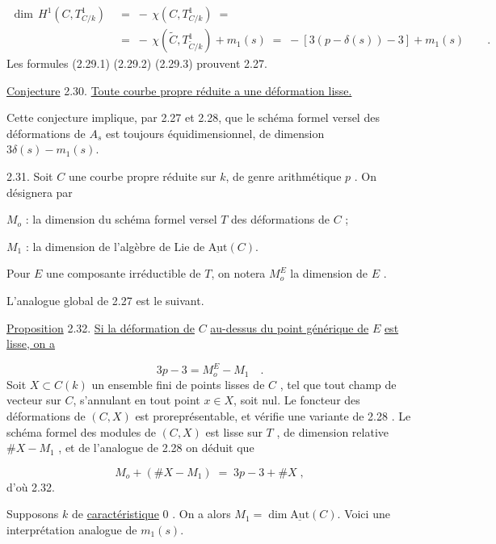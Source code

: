 \begin{equation}\tag{2.29.3}
\begin{aligned}\dim\, H^1(C,T^1_{C/k}) \;&=\; -\,\chi(C,T^1_{C/k}) \;=\; \\ &=\; -\,\chi(\widetilde{C},T^1_{\widetilde{C}/k}) + m_1(s) \;=\; -[3(p-\delta(s))-3] + m_1(s) \qquad .\end{aligned}
\end{equation}
Les formules (2.29.1) (2.29.2) (2.29.3) prouvent 2.27.

\underline{Conjecture} 2.30. \quad \underline{Toute courbe propre réduite a une déformation lisse.}

Cette conjecture implique, par 2.27 et 2.28, que le schéma formel versel des déformations de $A_s$ est toujours équidimensionnel, de dimension $3\delta(s) - m_1(s)$.



2.31. Soit $C$ une courbe propre réduite sur $k$, de genre arithmétique $p$ . On désignera par

$M_o$ : la dimension du schéma formel versel $T$ des déformations de $C$ ;

$M_1$ : la dimension de l'algèbre de Lie de $\underline{\mathrm{Aut}}(C)$.

Pour $E$ une composante irréductible de $T$, on notera $M_o^E$ la dimension de $E$ .

L'analogue global de 2.27 est le suivant.

\underline{Proposition} 2.32. \underline{Si la déformation de} $C$ \underline{au-dessus du point générique de} $E$ \underline{est lisse, on a}

\begin{equation*}
3p-3 = M_o^E - M_1 \quad .
\end{equation*}
Soit $X \subset C(k)$ un ensemble fini de points lisses de $C$ , tel que tout champ de vecteur sur $C$, s'annulant en tout point $x \in X$, soit nul. Le foncteur des déformations de $(C,X)$ est proreprésentable, et vérifie une variante de 2.28 . Le schéma formel des modules de $(C,X)$ est lisse sur $T$ , de dimension relative $\# X - M_1$ , et de l'analogue de 2.28 on déduit que

\begin{equation*}
M_o + ( \# X - M_1) \;=\; 3p - 3 + \# X \; ,
\end{equation*}
d'où 2.32.

Supposons $k$ de \underline{caractéristique} $0$ . On a alors $M_1 = \dim \underline{\mathrm{Aut}}(C)$. Voici une interprétation analogue de $m_1(s)$.


